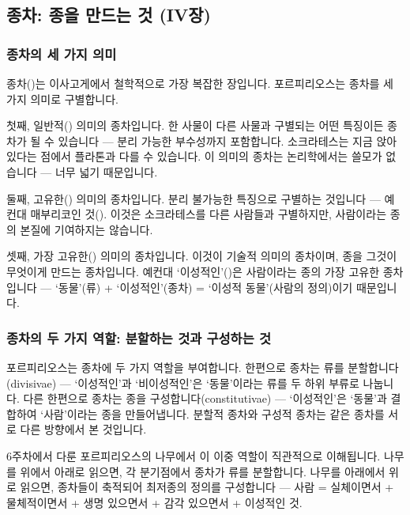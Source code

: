 \documentclass[12pt, a4paper]{article}
\begin{document}
\thispagestyle{firstpage}


\subsection{종차: 종을 만드는 것 (IV장)}

\subsubsection{종차의 세 가지 의미}

종차()는 이사고게에서 철학적으로 가장 복잡한 장입니다. 포르피리오스는 종차를 세 가지 의미로 구별합니다.

첫째, 일반적() 의미의 종차입니다. 한 사물이 다른 사물과 구별되는 어떤 특징이든 종차가 될 수 있습니다 --- 분리 가능한 부수성까지 포함합니다. 소크라테스는 지금 앉아 있다는 점에서 플라톤과 다를 수 있습니다. 이 의미의 종차는 논리학에서는 쓸모가 없습니다 --- 너무 넓기 때문입니다.

둘째, 고유한() 의미의 종차입니다. 분리 불가능한 특징으로 구별하는 것입니다 --- 예컨대 매부리코인 것(). 이것은 소크라테스를 다른 사람들과 구별하지만, 사람이라는 종의 본질에 기여하지는 않습니다.

셋째, 가장 고유한() 의미의 종차입니다. 이것이 기술적 의미의 종차이며, 종을 그것이 무엇이게 만드는 종차입니다. 예컨대 `이성적인'()은 사람이라는 종의 가장 고유한 종차입니다 --- `동물'(류) + `이성적인'(종차) = `이성적 동물'(사람의 정의)이기 때문입니다.

\subsubsection{종차의 두 가지 역할: 분할하는 것과 구성하는 것}

포르피리오스는 종차에 두 가지 역할을 부여합니다. 한편으로 종차는 류를 분할합니다(divisivae) --- `이성적인'과 `비이성적인'은 `동물'이라는 류를 두 하위 부류로 나눕니다. 다른 한편으로 종차는 종을 구성합니다(constitutivae) --- `이성적인'은 `동물'과 결합하여 `사람'이라는 종을 만들어냅니다. 분할적 종차와 구성적 종차는 같은 종차를 서로 다른 방향에서 본 것입니다.

6주차에서 다룬 포르피리오스의 나무에서 이 이중 역할이 직관적으로 이해됩니다. 나무를 위에서 아래로 읽으면, 각 분기점에서 종차가 류를 분할합니다. 나무를 아래에서 위로 읽으면, 종차들이 축적되어 최저종의 정의를 구성합니다 --- 사람 = 실체이면서 + 물체적이면서 + 생명 있으면서 + 감각 있으면서 + 이성적인 것.
\end{document}
